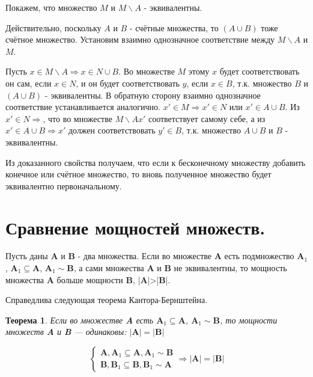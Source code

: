 \documentclass[12pt, a4paper, oneside]{article}
\theoremstyle{plain} %
\newtheorem{theorem}{Теорема}[section]
\theoremstyle{definition}
\begin{document}
\begin{enumerate}
    
    Покажем, что множество $M$ и $M \backslash A$ - эквивалентны.
    
    
    Действительно, поскольку $A$ и $B$ - счётные множества, то $(A \cup B)$ тоже счётное множество. Установим взаимно однозначное соответствие между $M \backslash A$ и $M$. 
    
    
    Пусть $x \in M \backslash A \Rightarrow x \in N \cup B$. Во множестве $M$ этому $x$ будет соответствовать он сам, если $x \in N$, и он будет соответствовать $y$, если $x \in B$, т.к. множество $B$ и $(A \cup B)$ - эквивалентны. В обратную сторону взаимно однозначное соответствие устанавливается аналогично. $x' \in M \Rightarrow x' \in N$ или $x' \in A \cup B$. Из $x' \in N \Rightarrow$, что во множестве $M \backslash A x'$ соответствует самому себе, а из $x' \in A \cup B \Rightarrow x'$ должен соответствовать $y' \in B$, т.к. множество $A \cup B$ и $B$ - эквивалентны. 
    
    
    Из доказанного свойства получаем, что если к бесконечному множеству добавить конечное или счётное множество, то вновь полученное множество будет эквивалентно первоначальному.

\end{enumerate}

\section{Сравнение мощностей множеств.}

Пусть даны \textbf{A} и \textbf{B} - два множества. Если во множестве \textbf{A} есть подмножество $\textbf{A}_1$, $\textbf{A}_1 \subseteq \textbf{A}$, $\textbf{A}_1 \sim \textbf{B}$, а сами множества \textbf{A} и \textbf{B} не эквивалентны, то мощность множества \textbf{A} больше мощности \textbf{B}, \Rightarrow |\textbf{A}|>|\textbf{B}|.


Справедлива следующая теорема Кантора-Бернштейна. 

\begin{theorem}

Если во множестве \textbf{A} есть $\textbf{A}_1 \subseteq \textbf{A}$, $\textbf{A}_1 \sim \textbf{B}$, то мощности множеств \textbf{A} и \textbf{B} --- одинаковы: $|\textbf{A}| = |\textbf{B}|$

\[ 
\begin{cases}
\mathbf{A}, \mathbf{A}_1 \subseteq \mathbf{A}, \mathbf{A}_1 \sim \mathbf{B} \\
\mathbf{B}, \mathbf{B}_1 \subseteq \mathbf{B}, \mathbf{B}_1 \sim \mathbf{A}
\end{cases}
\Rightarrow |\mathbf{A}| = |\mathbf{B}|
\]

\end{theorem}
\end{document}
